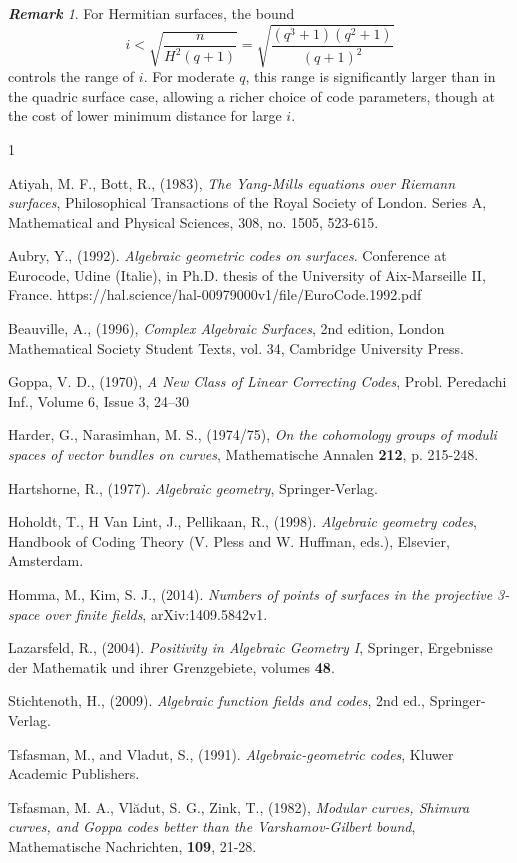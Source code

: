 \documentclass[14pt]{amsart}
\theoremstyle{plain}
\theoremstyle{definition}
\theoremstyle{remark}
\newtheorem{rem}[thm]{\bf Remark}
\theoremstyle{example}
\begin{document}
\begin{rem}
For Hermitian surfaces, the bound
$$i < \sqrt{\frac{n}{H^2(q+1)}} = \sqrt{\frac{(q^3+1)(q^2+1)}{(q+1)^2}}$$
controls the range of $i$. For moderate $q$, this range is significantly larger than in the quadric surface case, allowing a richer choice of code parameters, though at the cost of lower minimum distance for large $i$.
\end{rem}



\def\baselinestretch{1}

\def\baselinestretch{1.66}

\begin{thebibliography}{1}

 Atiyah, M. F., Bott, R., (1983), \textit{The Yang-Mills equations over Riemann surfaces}, Philosophical Transactions of the Royal Society of London. Series A, Mathematical and Physical Sciences, 308, no. 1505, 523-615.

 Aubry, Y., (1992). \textit{Algebraic geometric codes on surfaces}. Conference at Eurocode, Udine (Italie), in Ph.D. thesis of the University of Aix-Marseille II, France. https://hal.science/hal-00979000v1/file/EuroCode.1992.pdf

 Beauville, A., (1996), \textit{Complex Algebraic Surfaces}, 2nd edition, London Mathematical Society Student Texts, vol. 34, Cambridge University Press.

 Goppa, V. D., (1970), \textit{A New Class of Linear Correcting Codes}, Probl. Peredachi Inf., Volume 6, Issue 3, 24–30

 Harder, G., Narasimhan, M. S., (1974/75), \textit{On the cohomology groups of moduli spaces of vector bundles on curves}, Mathematische Annalen \textbf{212}, p. 215-248.

 Hartshorne, R., (1977). \textit{Algebraic geometry}, Springer-Verlag.

 Hoholdt, T., H Van Lint, J., Pellikaan, R., (1998). \textit{Algebraic geometry codes}, Handbook of Coding Theory (V. Pless and W. Huffman, eds.), Elsevier, Amsterdam.

 Homma, M., Kim, S. J., (2014). \textit{Numbers of points of surfaces in the projective 3-space over finite fields}, arXiv:1409.5842v1.

 Lazarsfeld, R., (2004). \textit{Positivity in Algebraic Geometry I}, Springer, Ergebnisse der Mathematik und ihrer Grenzgebiete, volumes \textbf{48}.

 Stichtenoth, H., (2009). \textit{Algebraic function fields and codes}, 2nd ed., Springer-Verlag.

 Tsfasman, M., and Vladut, S., (1991). \textit{Algebraic-geometric codes},
Kluwer Academic Publishers.

Tsfasman, M. A., Vl\u{a}dut, S. G., Zink, T., (1982), \textit{Modular curves, Shimura curves, and Goppa codes better than the Varshamov-Gilbert bound}, Mathematische Nachrichten, \textbf{109}, 21-28.
\end{thebibliography}
\end{document}
